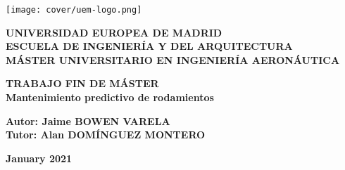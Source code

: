 

\begin{titlepage}
	\begin{center}
		\texttt{[image: cover/uem-logo.png]}
		\vspace{2cm}
		\large
		
		\textbf{UNIVERSIDAD EUROPEA DE MADRID}\\
		\vspace{0.5cm}
		\textbf{ESCUELA DE INGENIERÍA Y DEL ARQUITECTURA}\\
		\vspace{0.5cm}
		\textbf{MÁSTER UNIVERSITARIO EN INGENIERÍA AERONÁUTICA}\\ \par
		\vspace{3cm}
		\textbf{TRABAJO FIN DE MÁSTER}\\
		\vspace{0.5cm}
		\textbf{Mantenimiento predictivo de rodamientos \\}\par
		
		
			\vspace{4cm}	
		\begin{flushright}
			\textbf{Autor: Jaime BOWEN VARELA\\
				Tutor: Alan DOMÍNGUEZ MONTERO\\}
		\end{flushright}
		\vspace{2.5cm}
		\textbf{January 2021}
		
		
		
	\end{center}
\end{titlepage}
